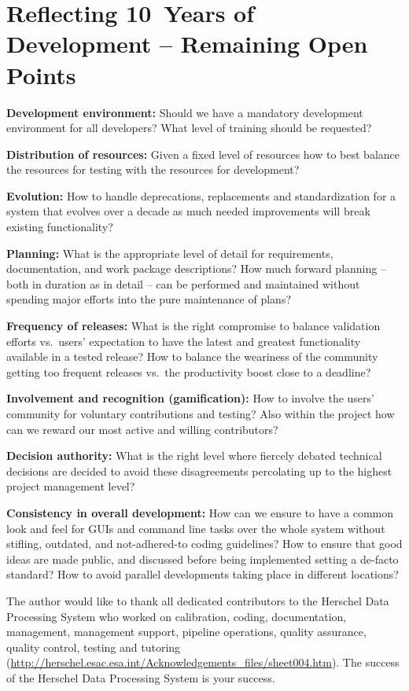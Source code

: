 \section{Reflecting 10~Years of Development -- Remaining Open Points}
\begin{description}
\item {\bf Development environment:} Should we have a mandatory development environment for all developers? What level of training should be requested?
\item {\bf Distribution of resources:} Given a fixed level of resources how to best balance the resources for testing with the resources for development?
\item {\bf Evolution:} How to handle deprecations, replacements and standardization for a system that evolves over a decade as much needed improvements will break existing functionality?
\item {\bf Planning:} What is the appropriate level of detail for requirements, documentation, and work package descriptions? How much forward planning -- both in duration as in detail -- can be performed and maintained without spending major efforts into the pure maintenance of plans?
\item {\bf Frequency of releases:} What is the right compromise to balance validation efforts vs.\ users' expectation to have the latest and greatest functionality available in a tested release? How to balance the weariness of the community getting too frequent releases vs.\ the productivity boost close to a deadline?
\item {\bf Involvement and recognition (gamification):} How to involve the users' community for voluntary contributions and testing? Also within the project how can we reward our most active and willing contributors?
\item {\bf Decision authority:} What is the right level where fiercely debated technical decisions are decided to avoid these disagreements percolating up to the highest project management level?
\item {\bf Consistency in overall development:} How can we ensure to have a common look and feel for GUIs and command line tasks over the whole system without stifling, outdated, and not-adhered-to coding guidelines? How to ensure that good ideas are made public, and discussed before being implemented setting a de-facto standard? How to avoid parallel developments taking place in different locations?
\end {description}

\acknowledgements The author would like to thank all dedicated contributors to the Herschel Data Processing System who worked on calibration, coding, documentation, management, management support, pipeline operations, quality assurance, quality control, testing and tutoring (\url{http://herschel.esac.esa.int/Acknowledgements\_files/sheet004.htm}). The success of the Herschel Data Processing System is your success.


